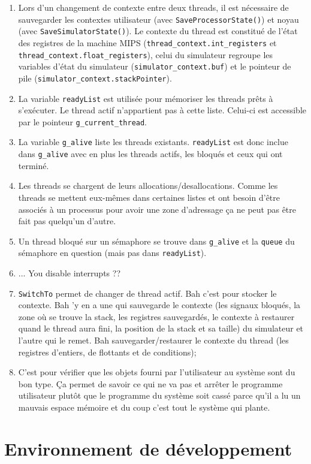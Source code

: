 \documentclass{article}
\begin{document}
\begin{enumerate}
\item Lors d'un changement de contexte entre deux threads, il est nécessaire de sauvegarder les contextes utilisateur (avec {\tt SaveProcessorState()}) et noyau (avec {\tt SaveSimulatorState()}). Le contexte du thread est constitué de l'état des registres de la machine MIPS (\texttt{thread\_context.int\_registers} et \texttt{thread\_context.float\_registers}), celui du simulateur regroupe les variables d'état du simulateur (\texttt{simulator\_context.buf}) et le pointeur de pile (\texttt{simulator\_context.stackPointer}). %
\item La variable {\tt readyList} est utilisée pour mémoriser les threads prêts à s'exécuter. Le thread actif n'appartient pas à cette liste. Celui-ci est accessible par le pointeur {\tt g\_current\_thread}.
\item La variable {\tt g\_alive} liste les threads existants. {\tt readyList} est donc inclue dans {\tt g\_alive} avec en plus les threads actifs, les bloqués et ceux qui ont terminé.
\item Les threads se chargent de leurs allocations/desallocations. Comme les threads se mettent eux-mêmes dans certaines listes et ont besoin d'être associés à un processus pour avoir une zone d'adressage ça ne peut pas être fait pas quelqu'un d'autre.
\item Un thread bloqué sur un sémaphore se trouve dans {\tt g\_alive} et la {\tt queue} du sémaphore en question (mais pas dans {\tt readyList}).
\item ... You disable interrupts ??
\item {\tt SwitchTo} permet de changer de thread actif. Bah c'est pour stocker le contexte. Bah 'y en a une qui sauvegarde le contexte (les signaux bloqués, la zone où se trouve la stack, les registres sauvegardés, le contexte à restaurer quand le thread aura fini, la position de la stack et sa taille) du simulateur et l'autre qui le remet. Bah sauvegarder/restaurer le contexte du thread (les registres d'entiers, de flottants et de conditions);
\item C'est pour vérifier que les objets fourni par l'utilisateur au système sont du bon type. Ça permet de savoir ce qui ne va pas et arrêter le programme utilisateur plutôt que le programme du système soit cassé parce qu'il a lu un mauvais espace mémoire et du coup c'est tout le système qui plante.
\end{enumerate}

\section{Environnement de développement}
\end{document}
